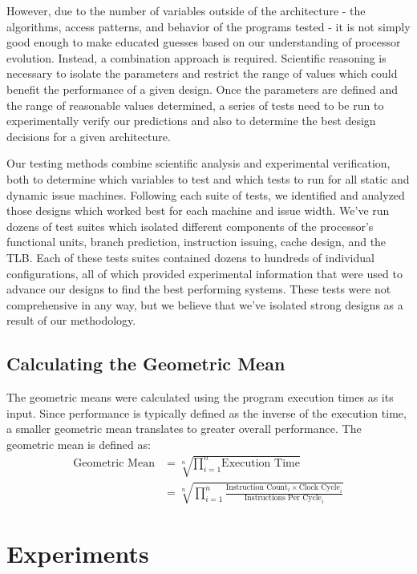 \documentclass[paper=a4, fontsize=12pt]{scrartcl} %
\numberwithin{equation}{section} %
\numberwithin{figure}{section} %
\numberwithin{table}{section} %
\begin{document}
However, due to the number of variables outside of the architecture - the algorithms, access patterns, and behavior of the programs tested - it is not simply good enough to make educated guesses based on our understanding of processor evolution. Instead, a combination approach is required. Scientific reasoning is necessary to isolate the parameters and restrict the range of values which could benefit the performance of a given design. Once the parameters are defined and the range of reasonable values determined, a series of tests need to be run to experimentally verify our predictions and also to determine the best design decisions for a given architecture.

Our testing methods combine scientific analysis and experimental verification, both to determine which variables to test and which tests to run for all static and dynamic issue machines. Following each suite of tests, we identified and analyzed those designs which worked best for each machine and issue width. We've run dozens of test suites which isolated different components of the processor's functional units, branch prediction, instruction issuing, cache design, and the TLB. Each of these tests suites contained dozens to hundreds of individual configurations, all of which provided experimental information that were used to advance our designs to find the best performing systems. These tests were not comprehensive in any way, but we believe that we've isolated strong designs as a result of our methodology.

\subsection{Calculating the Geometric Mean}

The geometric means were calculated using the program execution times as its input. Since performance is typically defined as the inverse of the execution time, a smaller geometric mean translates to greater overall performance. The geometric mean is defined as:
\begin{align*}
	\text{Geometric Mean} &= \sqrt[n] {\prod_{i=1}^{n} \text{Execution Time}} \\
	&= \sqrt[n] {\prod_{i=1}^{n} \frac{\text{Instruction Count}_i \times \text{Clock Cycle}_i}{\text{Instructions Per Cycle}_i}} 
\end{align*}


\section{Experiments}
\end{document}
